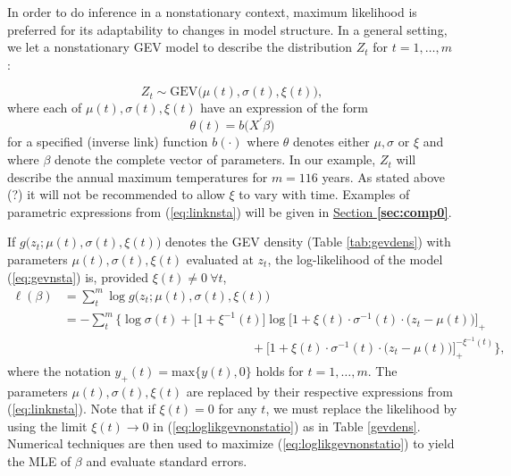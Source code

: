 In order to do inference in a nonstationary context, maximum likelihood is preferred for its adaptability to changes in model structure. In a general setting, we let a nonstationary GEV model to describe the distribution $Z_t$ for $t=1,\ldots,m$ :

\begin{equation}\label{eq:gevnsta}
Z_t\sim \text{GEV}\big(\mu(t), \sigma(t),\xi(t)\big),
\end{equation}
where each of $\mu(t),\sigma(t), \xi(t)$ have an expression of the form
\begin{equation}\label{eq:linknsta}
\theta(t)=b\big(X^{'}\beta\big)
\end{equation}
for a specified (inverse link) function $b(\cdot)$ where $\theta$ denotes either $\mu,\sigma$ or $\xi$ and where $\beta$ denote the complete vector of parameters. In our example, $Z_t$ will describe the annual maximum temperatures for $m=116$ years.
As stated above (?) it will not be recommended to allow $\xi$ to vary with time. Examples of parametric expressions from (\ref{eq:linknsta}) will be given in \hyperref[sec:comp0]{Section \textbf{\ref{sec:comp0}}}.

If $g\big(z_t; \mu(t),\sigma(t),\xi(t)\big)$ denotes the GEV density (Table \ref{tab:gevdens}) with parameters $\mu(t),\sigma(t),\xi(t)$ evaluated at $z_t$, the log-likelihood of the model (\ref{eq:gevnsta}) is, provided $\xi(t)\neq0 \ \forall t$,
\begin{equation}\label{eq:loglikgevnonstatio}
\begin{aligned}
\ell(\beta)& = \sum_t^m\log g\big(z_t; \mu(t),\sigma(t),\xi(t)\big)\\ & = -\sum_t^m\Bigg\{ \log\sigma(t)+\big[1+\xi^{-1}(t)\big]\log\bigg[1+\xi(t)\cdot\sigma^{-1}(t)\cdot\Big(z_t-\mu(t)\Big)\bigg]_+ \\ & \qquad\qquad\qquad\qquad\qquad\qquad\qquad\quad +  \bigg[1+\xi(t)\cdot\sigma^{-1}(t)\cdot\Big(z_t-\mu(t)\Big)\bigg]_+^{-\xi^{-1}(t)} \Bigg\},
\end{aligned}
\end{equation}
where the notation  $y_+(t)=\text{max}\big\{y(t),0\big\}$ holds for $t=1,\ldots,m$. The parameters $\mu(t),\sigma(t),\xi(t)$ are replaced by their respective expressions from (\ref{eq:linknsta}). Note that if $\xi(t)=0$ for any $t$, we must replace the likelihood by using the limit $\xi(t)\to0$ in (\ref{eq:loglikgevnonstatio}) as in Table \ref{gevdens}. 
Numerical techniques are then used to maximize (\ref{eq:loglikgevnonstatio}) to yield the MLE of $\beta$ and evaluate standard errors.  



